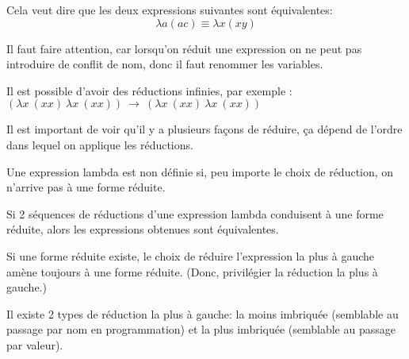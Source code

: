 \begin{mydef}
	Cela veut dire que les deux expressions suivantes sont équivalentes:
	$$\lambda a (a c) \equiv \lambda x (x y)$$
\end{mydef}

\begin{myrem}
	Il faut faire attention, car lorsqu'on réduit une expression on ne peut
	pas introduire de conflit de nom, donc il faut renommer les variables.
\end{myrem}

\begin{myrem}
	Il est possible d'avoir des réductions infinies, par exemple :\\
	$(\lambda x\ (xx)\ \lambda x \ (xx)) \ \rightarrow \ (\lambda x\ (xx) \
\lambda x \ (xx))$
\end{myrem}

\begin{myrem}
	Il est important de voir qu'il y a plusieurs façons de réduire, ça
	dépend de l'ordre dans lequel on applique les réductions.
\end{myrem}

\begin{myprop}
	Une expression lambda est non définie si, peu importe le choix de
	réduction, on n'arrive pas à une forme réduite.
\end{myprop}

\begin{mytheo} Si 2 séquences de réductions d'une expression
	lambda conduisent à une forme réduite, alors les expressions obtenues
	sont équivalentes.
\end{mytheo}

\begin{myprop}
	Si une forme réduite existe, le choix de réduire l'expression la plus à
	gauche amène toujours à une forme réduite. (Donc, privilégier la
	réduction la plus à gauche.)
\end{myprop}

\begin{myrem}
	Il existe 2 types de réduction la plus à gauche: la moins imbriquée
	(semblable au passage par nom en programmation) et la plus imbriquée
	(semblable au passage par valeur).
\end{myrem}

